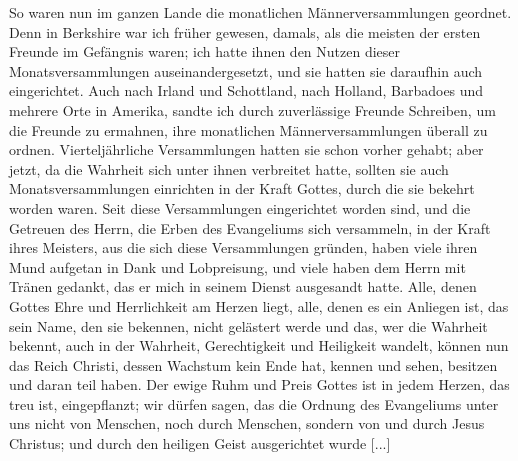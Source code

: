 So waren nun im ganzen Lande die monatlichen Männerversammlungen 
geordnet. Denn in Berkshire war ich früher
gewesen, damals, als die meisten der ersten Freunde im
Gefängnis waren; ich hatte ihnen den Nutzen dieser 
Monatsversammlungen auseinandergesetzt, und sie hatten sie daraufhin auch
eingerichtet. Auch nach Irland und 
Schottland, nach Holland,
Barbadoes und mehrere Orte in Amerika, sandte ich 
durch zuverlässige Freunde Schreiben, um die Freunde zu ermahnen, ihre
monatlichen Männerversammlungen überall zu ordnen. Vierteljährliche 
Versammlungen hatten sie schon vorher gehabt; aber
jetzt, da die Wahrheit sich unter ihnen verbreitet hatte, sollten sie
auch Monatsversammlungen einrichten in der Kraft Gottes, durch
die sie bekehrt worden waren. Seit diese Versammlungen eingerichtet 
worden sind, und die Getreuen des Herrn, die Erben des
Evangeliums sich versammeln, in der Kraft ihres Meisters, aus
die sich diese Versammlungen gründen, haben viele ihren Mund
aufgetan in Dank und Lobpreisung, und viele haben dem Herrn
mit Tränen gedankt, das er mich in seinem Dienst ausgesandt
hatte. Alle, denen Gottes Ehre und Herrlichkeit am Herzen liegt,
alle, denen es ein Anliegen ist, das sein Name, den sie bekennen,
nicht gelästert werde und das, wer die Wahrheit bekennt, auch
in der Wahrheit, Gerechtigkeit und Heiligkeit wandelt, können nun
das Reich Christi, dessen Wachstum kein Ende hat, 
kennen und sehen, besitzen und daran teil haben. Der ewige Ruhm und Preis
Gottes ist in jedem Herzen, das treu ist, eingepflanzt; wir
dürfen sagen, das die Ordnung des Evangeliums unter uns
nicht von Menschen, noch durch Menschen, sondern von und
durch Jesus Christus; und durch den heiligen Geist ausgerichtet
wurde [...]

